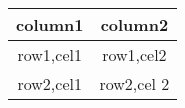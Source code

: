 \documentclass{article}
\begin{document}
	\begin{table}
		
		
		\centering
		\begin{tabular}{|c|c|}
			\hline
			column1 & column2 \\
			\hline
			row1,cel1 & row1,cel2 \\
			row2,cel1 & row2,cel 2
			\hline
		
		\end{tabular}
	\end{table}
\end{document}
